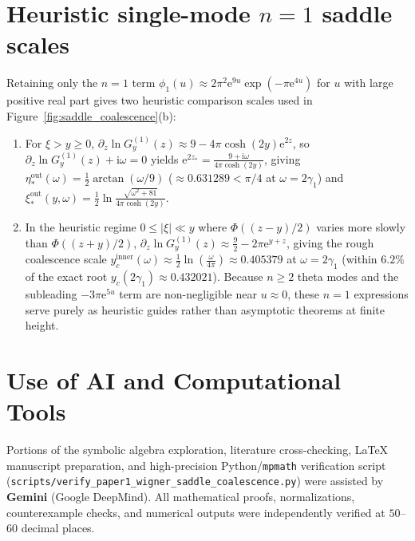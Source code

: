 \documentclass[11pt,a4paper,reqno]{amsart}
\theoremstyle{definition}
\theoremstyle{remark}
\numberwithin{equation}{section}
\newcommand{\ii}{\mathrm{i}}
\newcommand{\ee}{\mathrm{e}}
\begin{document}
\appendix

\section{Heuristic single-mode $n=1$ saddle scales}\label{app:n1_scales}

Retaining only the $n=1$ term $\phi_1(u) \approx 2\pi^2\ee^{9u}\exp(-\pi\ee^{4u})$ for $u$ with large positive real part gives two heuristic comparison scales used in Figure~\ref{fig:saddle_coalescence}(b):
\begin{enumerate}
\item For $\xi > y \ge 0$, $\partial_z\ln G_y^{(1)}(z) \approx 9 - 4\pi\cosh(2y)\ee^{2z}$, so $\partial_z\ln G_y^{(1)}(z) + \ii\omega = 0$ yields $\ee^{2z_*} = \frac{9 + \ii\omega}{4\pi\cosh(2y)}$, giving $\eta_*^{\mathrm{out}}(\omega) = \frac{1}{2}\arctan(\omega/9)$ ($\approx 0.631289 < \pi/4$ at $\omega = 2\gamma_1$) and $\xi_*^{\mathrm{out}}(y,\omega) = \frac{1}{2}\ln\frac{\sqrt{\omega^2+81}}{4\pi\cosh(2y)}$.
\item In the heuristic regime $0 \le |\xi| \ll y$ where $\Phi((z-y)/2)$ varies more slowly than $\Phi((z+y)/2)$, $\partial_z\ln G_y^{(1)}(z) \approx \frac{9}{2} - 2\pi\ee^{y+z}$, giving the rough coalescence scale $y_c^{\mathrm{inner}}(\omega) \approx \frac{1}{2}\ln(\frac{\omega}{4\pi}) \approx 0.405379$ at $\omega = 2\gamma_1$ (within $6.2\%$ of the exact root $y_c(2\gamma_1) \approx 0.432021$). Because $n \ge 2$ theta modes and the subleading $-3\pi\ee^{5u}$ term are non-negligible near $u \approx 0$, these $n=1$ expressions serve purely as heuristic guides rather than asymptotic theorems at finite height.
\end{enumerate}

\section*{Use of AI and Computational Tools}

Portions of the symbolic algebra exploration, literature cross-checking, \LaTeX{} manuscript preparation, and high-precision Python/\texttt{mpmath} verification script (\nolinkurl{scripts/verify_paper1_wigner_saddle_coalescence.py}) were assisted by \textbf{Gemini} (Google DeepMind). All mathematical proofs, normalizations, counterexample checks, and numerical outputs were independently verified at $50$--$60$ decimal places.
\end{document}
